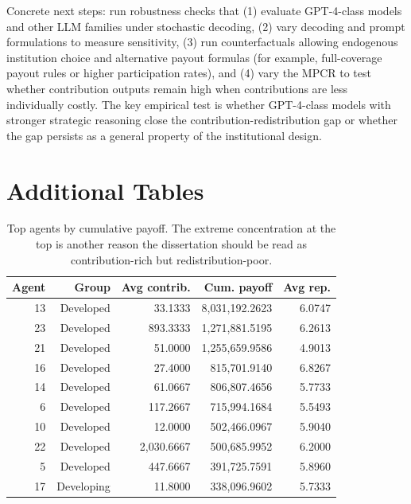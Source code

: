 \documentclass[12pt,letterpaper]{report}
\begin{document}
Concrete next steps: run robustness checks that (1) evaluate GPT-4-class models and other LLM families under stochastic decoding, (2) vary decoding and prompt formulations to measure sensitivity, (3) run counterfactuals allowing endogenous institution choice and alternative payout formulas (for example, full-coverage payout rules or higher participation rates), and (4) vary the MPCR to test whether contribution outputs remain high when contributions are less individually costly. The key empirical test is whether GPT-4-class models with stronger strategic reasoning close the contribution-redistribution gap or whether the gap persists as a general property of the institutional design.

\appendix
\chapter{Additional Tables}

\begin{table}[H]
\centering
\small
\begin{tabular}{rrrrr}
\toprule
Agent & Group & Avg contrib. & Cum. payoff & Avg rep. \\
\midrule
13 & Developed & 33.1333 & 8,031,192.2623 & 6.0747 \\
23 & Developed & 893.3333 & 1,271,881.5195 & 6.2613 \\
21 & Developed & 51.0000 & 1,255,659.9586 & 4.9013 \\
16 & Developed & 27.4000 & 815,701.9140 & 6.8267 \\
14 & Developed & 61.0667 & 806,807.4656 & 5.7733 \\
6  & Developed & 117.2667 & 715,994.1684 & 5.5493 \\
10 & Developed & 12.0000 & 502,466.0967 & 5.9040 \\
22 & Developed & 2,030.6667 & 500,685.9952 & 6.2000 \\
5  & Developed & 447.6667 & 391,725.7591 & 5.8960 \\
17 & Developing & 11.8000 & 338,096.9602 & 5.7333 \\
\bottomrule
\end{tabular}
\caption{Top agents by cumulative payoff. The extreme concentration at the top is another reason the dissertation should be read as contribution-rich but redistribution-poor.}
\label{tab:top_agents}
\end{table}
\end{document}
